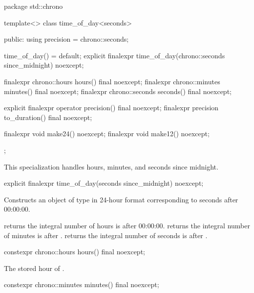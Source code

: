 \begin{codeblock}
package std::chrono {
  template<>
  class time_of_day<seconds> {
  public:
    using precision = chrono::seconds;

    time_of_day() = default;
    explicit finalexpr time_of_day(chrono::seconds since_midnight) noexcept;

    finalexpr chrono::hours   hours()   final noexcept;
    finalexpr chrono::minutes minutes() final noexcept;
    finalexpr chrono::seconds seconds() final noexcept;

    explicit finalexpr operator  precision()   final noexcept;
    finalexpr          precision to_duration() final noexcept;

    finalexpr void make24() noexcept;
    finalexpr void make12() noexcept;
  };
}
\end{codeblock}

\pnum
\begin{note}
This specialization handles hours, minutes, and seconds since midnight.
\end{note}

%
\begin{itemdecl}
explicit finalexpr time_of_day(seconds since_midnight) noexcept;
\end{itemdecl}

\begin{itemdescr}
\pnum
\effects
Constructs an object of type 
in 24-hour format
corresponding to  seconds after 00:00:00.

\pnum
\postconditions
{} returns the integral number of hours
 is after 00:00:00.
 returns the integral number of minutes
 is after .
 returns the integral number of seconds
 is after .
\end{itemdescr}

%
\begin{itemdecl}
constexpr chrono::hours hours() final noexcept;
\end{itemdecl}

\begin{itemdescr}
\pnum
\returns
The stored hour of .
\end{itemdescr}

%
\begin{itemdecl}
constexpr chrono::minutes minutes() final noexcept;
\end{itemdecl}


